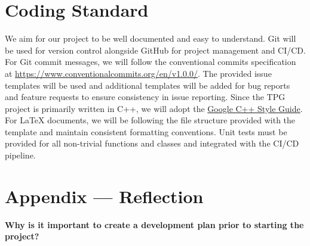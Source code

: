 \documentclass{article}
\begin{document}



\section{Coding Standard}

We aim for our project to be well documented and easy to understand. Git will be used for version control alongside GitHub for project management and CI/CD. For Git commit messages, we will follow the conventional commits specification at \url{https://www.conventionalcommits.org/en/v1.0.0/}. The provided issue templates will be used and additional templates will be added for bug reports and feature requests to ensure consistency in issue reporting. Since the TPG project is primarily written in C++, we will adopt the \href{https://google.github.io/styleguide/cppguide.html}{Google C++ Style Guide}. For LaTeX documents, we will be following the file structure provided with the template and maintain consistent formatting conventions. Unit tests must be provided for all non-trivial functions and classes and integrated with the CI/CD pipeline.

\newpage{}

\section*{Appendix --- Reflection}


\textbf{Why is it important to create a development plan prior to starting the project?}\\
\end{document}

